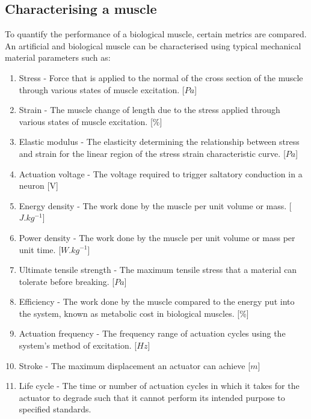 \subsection{Characterising a muscle}
To quantify the performance of a biological muscle, certain metrics are compared. An artificial and biological muscle can be characterised using typical mechanical material parameters such as:
\begin{enumerate}
    \item Stress - Force that is applied to the normal of the cross section of the muscle through various states of muscle excitation. [$Pa$]
    \item Strain - The muscle change of length due to the stress applied through various states of muscle excitation. [\%]
    \item Elastic modulus - The elasticity determining the relationship between stress and strain for the linear region of the stress strain characteristic curve. [$Pa$]
    \item Actuation voltage - The voltage required to trigger saltatory conduction in a neuron [V]
    \item Energy density - The work done by the muscle per unit volume or mass. [$J.kg^{-1}$]
    \item Power density - The work done by the muscle per unit volume or mass per unit time. [$W.kg^{-1}$]
    \item Ultimate tensile strength - The maximum tensile stress that a material can tolerate before breaking. [$Pa$]
    \item Efficiency - The work done by the muscle compared to the energy put into the system, known as metabolic cost in biological muscles. [\%]
    \item Actuation frequency - The frequency range of actuation cycles using the system's method of excitation. [$Hz$]
    \item Stroke - The maximum displacement an actuator can achieve [$m$]
    \item Life cycle - The time or number of actuation cycles in which it takes for the actuator to degrade such that it cannot perform its intended purpose to specified standards.

\end{enumerate}
